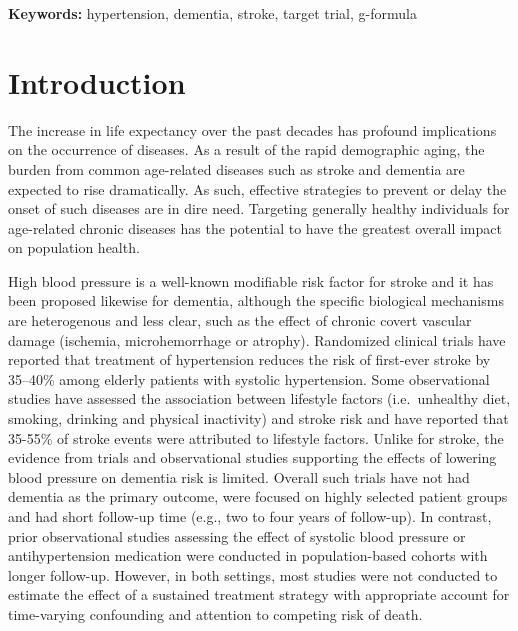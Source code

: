 \documentclass[
]{book}
\begin{document}
\textbf{Keywords:} hypertension, dementia, stroke, target trial, g-formula

\newpage

\hypertarget{introduction-1}{%
\section{Introduction}\label{introduction-1}}

The increase in life expectancy over the past decades has profound implications on the occurrence of diseases. As a result of the rapid demographic aging, the burden from common age-related diseases such as stroke and dementia are expected to rise dramatically\autocite{larson2008}. As such, effective strategies to prevent or delay the onset of such diseases are in dire need. Targeting generally healthy individuals for age-related chronic diseases has the potential to have the greatest overall impact on population health\autocite{bauer2014}.

High blood pressure is a well-known modifiable risk factor for stroke\autocite{johnson2019} and it has been proposed likewise for dementia\autocite{lancet2020}, although the specific biological mechanisms are heterogenous and less clear, such as the effect of chronic covert vascular damage (ischemia, microhemorrhage or atrophy)\autocite{hughes2020}. Randomized clinical trials have reported that treatment of hypertension reduces the risk of first-ever stroke by 35--40\% among elderly patients with systolic hypertension\autocite{ace_inhibitors2000,chobanian2003}. Some observational studies have assessed the association between lifestyle factors (i.e.~unhealthy diet, smoking, drinking and physical inactivity) and stroke risk and have reported that 35-55\% of stroke events were attributed to lifestyle factors\autocite{braillon2015,zhang2012,prince1996}. Unlike for stroke, the evidence from trials and observational studies supporting the effects of lowering blood pressure on dementia risk is limited. Overall such trials have not had dementia as the primary outcome, were focused on highly selected patient groups and had short follow-up time (e.g., two to four years of follow-up)\autocite{ace_inhibitors2000,prince1996,forette2002,progress2003,lithell2003,diener2008,anderson2011,williamson2019,ding2020}. In contrast, prior observational studies assessing the effect of systolic blood pressure or antihypertension medication were conducted in population-based cohorts with longer follow-up\autocite{ding2020,liang2018}. However, in both settings, most studies were not conducted to estimate the effect of a sustained treatment strategy with appropriate account for time-varying confounding and attention to competing risk of death.
\end{document}
